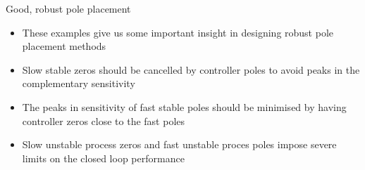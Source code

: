 \documentclass{beamer-control}
\begin{document}

\begin{frame}{Good, robust pole placement}
	\begin{itemize}
		\item These examples give us some important insight in designing robust pole placement methods
		\item Slow stable zeros should be cancelled by controller poles to avoid peaks in the complementary sensitivity
		\item The peaks in sensitivity of fast stable poles should be minimised by having controller zeros close to the fast poles
		\item Slow unstable process zeros and fast unstable proces poles impose severe limits on the closed loop performance 
	\end{itemize}
\end{frame}

\SUMMARYFRAME
\FINALE
\end{document}
